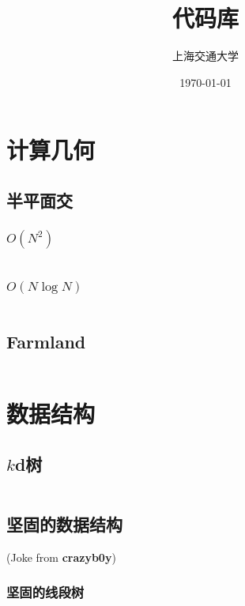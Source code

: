 \documentclass[a4paper]{article}
\title{代码库}
\author{上海交通大学}
\date{\today}
\newcommand{\cppcode}[1]{
    \inputminted[mathescape]{cpp}{source/#1}
}
\begin{document}
\maketitle

\tableofcontents

\clearpage

\section{计算几何}

\subsection{半平面交}

\subsubsection{$O(N^2)$}

\cppcode{half-plane-intersection-n2.cpp}

\subsubsection{$O(N \log N)$}

\cppcode{half-plane-intersection-nlogn.cpp}

\subsection{Farmland}

\cppcode{lq-farmland.cpp}

\section{数据结构}

\subsection{$k$d树}

\cppcode{kd-tree.cpp}

\subsection{坚固的数据结构}

(Joke from \textbf{crazyb0y}) 

\subsubsection{坚固的线段树}
\end{document}
